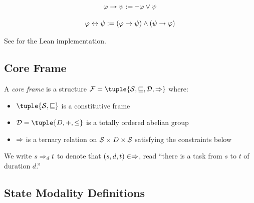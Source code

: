 \documentclass[../LogosReference.tex]{subfiles}
\begin{document}
\begin{definition}\label{def:material-conditional}
	\[
		\varphi \to \psi := \neg\varphi \lor \psi
	\]
\end{definition}

\begin{definition}[Biconditional]\label{def:biconditional}
	\[
		\varphi \leftrightarrow \psi := (\varphi \to \psi) \land (\psi \to \varphi)
	\]
\end{definition}

See  for the Lean implementation.


\subsection{Core Frame}\label{sec:core-frame}

\begin{definition}\label{def:core-frame}
	A \emph{core frame} is a structure $\mframe = \tuple{\statespace, \parthood, \temporalorder, \taskrel}$ where:
	\begin{itemize}
		\item $\tuple{\statespace, \parthood}$ is a constitutive frame
		\item $\temporalorder = \tuple{D, +, \leq}$ is a totally ordered abelian group
		\item $\Rightarrow$ is a ternary relation on $\mathcal{S} \times D \times \mathcal{S}$ satisfying the constraints below
	\end{itemize}
\end{definition}

\begin{notation}
	We write $s \Rightarrow_{d} t$ to denote that $(s, d, t) \in \Rightarrow$, read ``there is a task from $s$ to $t$ of duration $d$.''
\end{notation}


\subsection{State Modality Definitions}\label{sec:state-modality}
\end{document}
